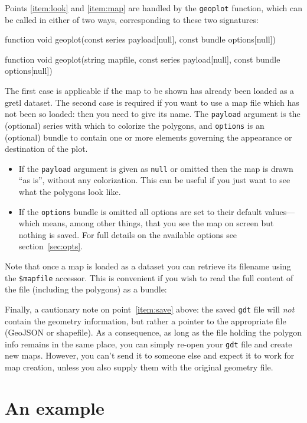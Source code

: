 \documentclass{article}
\begin{document}
Points \ref{item:look} and \ref{item:map} are handled by the
\texttt{geoplot} function, which can be called in either of two ways,
corresponding to these two signatures:
\begin{code}
function void geoplot(const series payload[null], const bundle options[null])

function void geoplot(string mapfile, const series payload[null],
                      const bundle options[null])
\end{code}
The first case is applicable if the map to be shown has already been
loaded as a gretl dataset. The second case is required if you want to
use a map file which has not been so loaded: then you need to give its
name. The \texttt{payload} argument is the (optional) series with
which to colorize the polygons, and \texttt{options} is an (optional)
bundle to contain one or more elements governing the appearance or
destination of the plot.
\begin{itemize}
\item If the \texttt{payload} argument is given as \texttt{null} or
  omitted then the map is drawn ``as is'', without any
  colorization. This can be useful if you just want to see what the
  polygons look like.
\item If the \texttt{options} bundle is omitted all options are set to
  their default values---which means, among other things, that you see
  the map on screen but nothing is saved. For full details on the
  available options see section~\ref{sec:opts}.
\end{itemize}

Note that once a map is loaded as a dataset you can retrieve its
filename using the \verb|$mapfile| accessor. This is convenient if you
wish to read the full content of the file (including the polygons) as
a bundle:
Finally, a cautionary note on point~\ref{item:save} above: the saved
\texttt{gdt} file will \emph{not} contain the geometry information,
but rather a pointer to the appropriate file (GeoJSON or
shapefile). As a consequence, as long as the file holding the polygon
info remains in the same place, you can simply re-open your
\texttt{gdt} file and create new maps. However, you can't send it to
someone else and expect it to work for map creation, unless you also
supply them with the original geometry file.

\section{An example}
\label{sec:example}
\end{document}
